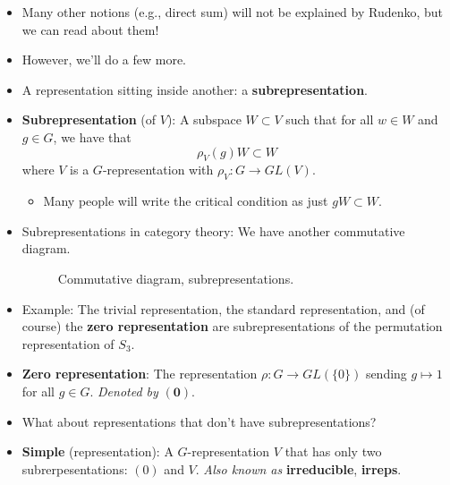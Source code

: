 \documentclass[../notes.tex]{subfiles}
\begin{document}
\begin{itemize}
\begin{itemize}
    \end{itemize}
    \item Many other notions (e.g., direct sum) will not be explained by Rudenko, but we can read about them!
    \item However, we'll do a few more.
    \item A representation sitting inside another: a \textbf{subrepresentation}.
    \item \textbf{Subrepresentation} (of $V$): A subspace $W\subset V$ such that for all $w\in W$ and $g\in G$, we have that
    \begin{equation*}
        \rho_V(g)W \subset W
    \end{equation*}
    where $V$ is a $G$-representation with $\rho_V:G\to GL(V)$.
    \begin{itemize}
        \item Many people will write the critical condition as just $gW\subset W$.
    \end{itemize}
    \item Subrepresentations in category theory: We have another commutative diagram.
    \begin{figure}[h!]
        \centering
        \DisableQuotes
        \EnableQuotes
        \vspace{-1.5em}
        \caption{Commutative diagram, subrepresentations.}
        \label{fig:CDsubreps}
    \end{figure}
    \item Example: The trivial representation, the standard representation, and (of course) the \textbf{zero representation} are subrepresentations of the permutation representation of $S_3$.
    \item \textbf{Zero representation}: The representation $\rho:G\to GL(\{0\})$ sending $g\mapsto 1$ for all $g\in G$. \emph{Denoted by} $\bm{(0)}$.
    \item What about representations that don't have subrepresentations?
    \item \textbf{Simple} (representation): A $G$-representation $V$ that has only two subrerpesentations: $(0)$ and $V$. \emph{Also known as} \textbf{irreducible}, \textbf{irreps}.

\end{itemize}
\end{document}
